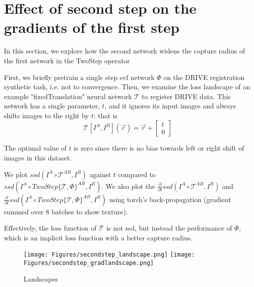 \section{Effect of second step on the gradients of the first step}
In this section, we explore how the second network widens the capture radius
of the first network in the TwoStep operator

First, we briefly pretrain a single step svf network $\Phi$ on the DRIVE
registration synthetic task, i.e. not to convergence. Then, we examine the
loss landscape of an example "fixedTranslation" neural network $\mathcal{T}$
to register DRIVE data. This network has a single parameter, $t$, and it
ignores its input images and always shifts images to the right by $t$: that is
\begin{equation}
	\mathcal{T}[I^A, I^B](\vec{r}) = \vec{r} + \begin{bmatrix}t \\ 0\end{bmatrix}
\end{equation}

The optimal value of $t$ is zero since there is no bias towards left or right
shift of images in this dataset.

We plot $ssd(I^A \circ \mathcal{T}^{AB}, I^B)$ against $t$ compared to
$ssd(I^A \circ TwoStep\{\mathcal{T}, \Phi\}^{AB}, I^B)$. We also plot the
$\frac{\partial}{\partial t} ssd(I^A \circ \mathcal{T}^{AB}, I^B)$ and $\frac{\partial}{\partial t}ssd(I^A \circ TwoStep\{\mathcal{T}, \Phi\}^{AB}, I^B)$ using torch's
back-propagation (gradient summed over 8 batches to show texture).

Effectively, the loss function of $\mathcal{T}$ is not ssd, but instead the
performance of $\Phi$, which is an implicit loss function with a better
capture radius.

\begin{figure}
	\centering
	\texttt{[image: Figures/secondstep\_landscape.png]}
	\texttt{[image: Figures/secondstep\_gradlandscape.png]}
	\caption{Landscapes}
	\label{fig:my_label}
\end{figure}

